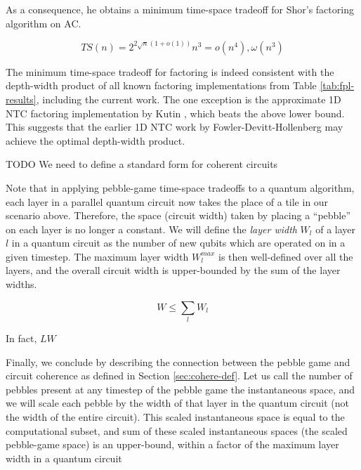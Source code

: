 As a consequence, he obtains a minimum time-space tradeoff for
Shor's factoring algorithm on \textsf{AC}.

\begin{equation}
TS(n) = 2^{2\sqrt{n}(1 + o(1))}n^3 = o(n^4), \omega(n^3)
\end{equation}

The minimum time-space tradeoff for factoring is indeed consistent with the depth-width product of all known
factoring implementations from Table \ref{tab:fpl-results}, including
the current work. The one exception is the approximate 1D NTC factoring
implementation by Kutin \cite{Kutin2006}, which beats the above lower bound.
This suggests that the earlier 1D NTC work by Fowler-Devitt-Hollenberg
\cite{Fowler2004} may achieve the optimal depth-width product.

TODO We need to define a standard form for coherent circuits

Note that in applying
pebble-game time-space tradeoffs to a quantum algorithm, each layer
in a parallel quantum circuit now takes the place of a tile in our
scenario above. Therefore, the space (circuit width) taken by placing a ``pebble'' on
each layer is no longer a constant. We will define the \emph{layer width}
$W_l$
of a layer $l$ in a quantum circuit as the number of new qubits which are operated on in
a given timestep. The maximum layer width $W_l^{max}$
is then well-defined over all the
layers, and the overall circuit width is upper-bounded by the sum of the
layer widths.

\begin{equation}
W \le \sum_{l} W_l
\end{equation}

In fact, $LW$ 

Finally, we conclude by describing the connection between the pebble game
and circuit coherence as defined in Section \ref{sec:cohere-def}.
Let us call the number of pebbles present at any timestep of the pebble game
the instantaneous space, and we will scale each pebble by the 
width of that layer in the quantum circuit (not the width of the entire circuit).
This scaled instantaneous space is equal to the computational subset, and
sum of these scaled instantaneous spaces (the scaled pebble-game space) is
an upper-bound, within a factor of the maximum layer width in a quantum
circuit